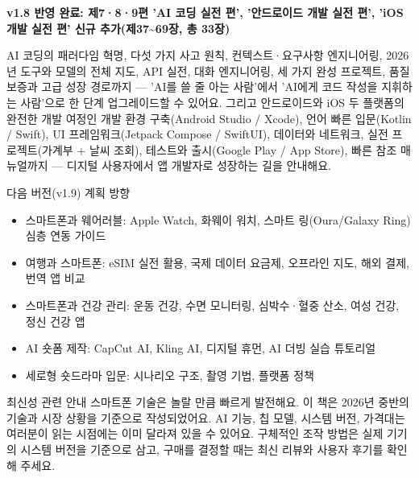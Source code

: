 

\textbf{v1.8 반영 완료: 제7·8·9편 'AI 코딩 실전 편', '안드로이드 개발 실전 편', 'iOS 개발 실전 편' 신규 추가(제37\textasciitilde{}69장, 총 33장)}\par

AI 코딩의 패러다임 혁명, 다섯 가지 사고 원칙, 컨텍스트·요구사항 엔지니어링, 2026년 도구와 모델의 전체 지도, API 실전, 대화 엔지니어링, 세 가지 완성 프로젝트, 품질 보증과 고급 성장 경로까지 — 'AI를 쓸 줄 아는 사람'에서 'AI에게 코드 작성을 지휘하는 사람'으로 한 단계 업그레이드할 수 있어요. 그리고 안드로이드와 iOS 두 플랫폼의 완전한 개발 여정인 개발 환경 구축(Android Studio / Xcode), 언어 빠른 입문(Kotlin / Swift), UI 프레임워크(Jetpack Compose / SwiftUI), 데이터와 네트워크, 실전 프로젝트(가계부 + 날씨 조회), 테스트와 출시(Google Play / App Store), 빠른 참조 매뉴얼까지 — 디지털 사용자에서 앱 개발자로 성장하는 길을 안내해요.

\begin{tcbinfo}{다음 버전(v1.9) 계획 방향}
\begin{itemize}
  \item 스마트폰과 웨어러블: Apple Watch, 화웨이 워치, 스마트 링(Oura/Galaxy Ring) 심층 연동 가이드
  \item 여행과 스마트폰: eSIM 실전 활용, 국제 데이터 요금제, 오프라인 지도, 해외 결제, 번역 앱 비교
  \item 스마트폰과 건강 관리: 운동 건강, 수면 모니터링, 심박수·혈중 산소, 여성 건강, 정신 건강 앱
  \item AI 숏폼 제작: CapCut AI, Kling AI, 디지털 휴먼, AI 더빙 실습 튜토리얼
  \item 세로형 숏드라마 입문: 시나리오 구조, 촬영 기법, 플랫폼 정책
\end{itemize}

\end{tcbinfo}

\begin{tcbwarn}{최신성 관련 안내}
스마트폰 기술은 놀랄 만큼 빠르게 발전해요. 이 책은 2026년 중반의 기술과 시장 상황을 기준으로 작성되었어요. AI 기능, 칩 모델, 시스템 버전, 가격대는 여러분이 읽는 시점에는 이미 달라져 있을 수 있어요. 구체적인 조작 방법은 실제 기기의 시스템 버전을 기준으로 삼고, 구매를 결정할 때는 최신 리뷰와 사용자 후기를 확인해 주세요.

\end{tcbwarn}
